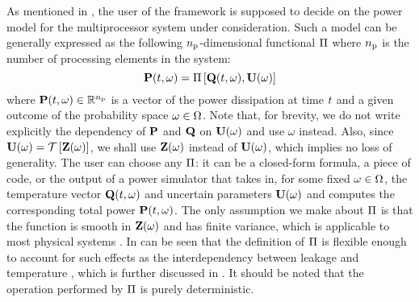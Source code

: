 As mentioned in , the user of the framework is supposed to decide on the power model for the multiprocessor system under consideration.
Such a model can be generally expressed as the following ${n_\text{p}}$-dimensional functional $\oPower$ where ${n_\text{p}}$ is the number of processing elements in the system:
\begin{equation} \elabel{power-model}
  \vP(\t, \o) = \oPower{\vTO(\t, \o), \vU(\o)}
\end{equation}
where $\mathbf{P}(t, \omega) \in \mathbb{R}^{n_\text{p}}$ is a vector of the power dissipation at time $t$ and a given outcome of the probability space $\omega \in \Omega$.
Note that, for brevity, we do not write explicitly the dependency of $\mathbf{P}$ and $\mathbf{Q}$ on $\mathbf{U}(\omega)$ and use $\omega$ instead.
Also, since $\vU(\o) = \oTransform{\vZ(\o)}$, we shall use $\mathbf{Z}(\omega)$ instead of $\mathbf{U}(\omega)$, which implies no loss of generality.
The user can choose any $\oPower$: it can be a closed-form formula, a piece of code, or the output of a power simulator that takes in, for some fixed $\omega \in \Omega$, the temperature vector $\mathbf{Q}(t, \omega)$ and uncertain parameters $\mathbf{U}(\omega)$ and computes the corresponding total power $\mathbf{P}(t, \omega)$.
The only assumption we make about $\oPower$ is that the function is smooth in $\mathbf{Z}(\omega)$ and has finite variance, which is applicable to most physical systems \cite{xiu2010}.
In can be seen that the definition of $\oPower$ is flexible enough to account for such effects as the interdependency between leakage and temperature \cite{srivastava2010, liu2007}, which is further discussed in .
It should be noted that the operation performed by $\oPower$ is purely deterministic.

